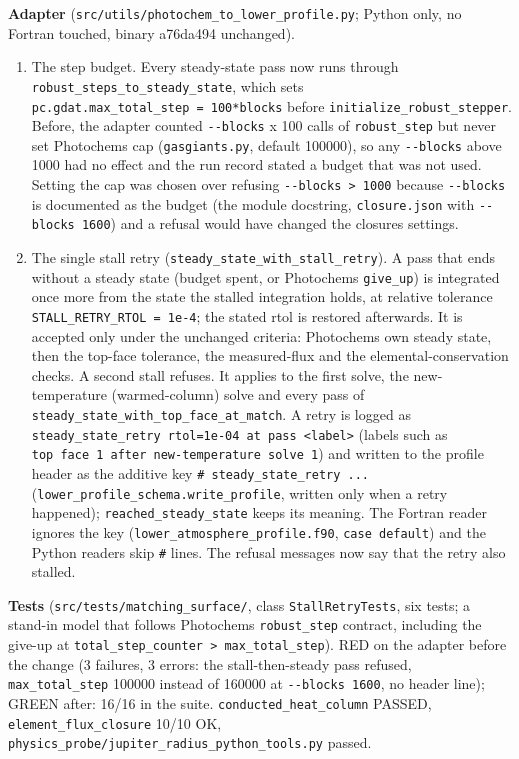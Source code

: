 \documentclass[english,a4paper]{my_memo}
\providecommand{\tightlist}{\setlength{\itemsep}{0pt}\setlength{\parskip}{0pt}}
\begin{document}
\textbf{Adapter} (\texttt{src/utils/photochem\_to\_lower\_profile.py}; Python only, no Fortran
touched, binary a76da494 unchanged).

\begin{enumerate}
\def\labelenumi{\arabic{enumi}.}
\tightlist
\item
  The step budget. Every steady-state pass now runs through
  \texttt{robust\_steps\_to\_steady\_state}, which sets \texttt{pc.gdat.max\_total\_step\ =\ 100*blocks}
  before \texttt{initialize\_robust\_stepper}. Before, the adapter counted \texttt{-\/-blocks} x 100
  calls of \texttt{robust\_step} but never set Photochem\textquotesingle s cap (\texttt{gasgiants.py},
  default 100000), so any \texttt{-\/-blocks} above 1000 had no effect and the run record
  stated a budget that was not used. Setting the cap was chosen over refusing
  \texttt{-\/-blocks\ \textgreater{}\ 1000} because \texttt{-\/-blocks} is documented as the budget (the module
  docstring, \texttt{closure.json} with \texttt{-\/-blocks\ 1600}) and a refusal would have changed
  the closure\textquotesingle s settings.
\item
  The single stall retry (\texttt{steady\_state\_with\_stall\_retry}). A pass that ends
  without a steady state (budget spent, or Photochem\textquotesingle s \texttt{give\_up}) is integrated
  once more from the state the stalled integration holds, at relative tolerance
  \texttt{STALL\_RETRY\_RTOL\ =\ 1e-4}; the stated rtol is restored afterwards. It is accepted
  only under the unchanged criteria: Photochem\textquotesingle s own steady state, then the top-face
  tolerance, the measured-flux and the elemental-conservation checks. A second stall
  refuses. It applies to the first solve, the new-temperature (warmed-column) solve
  and every pass of \texttt{steady\_state\_with\_top\_face\_at\_match}. A retry is logged as
  \texttt{steady\_state\_retry\ rtol=1e-04\ at\ pass\ \textless{}label\textgreater{}} (labels such as \texttt{top\ face\ 1\ after\ new-temperature\ solve\ 1}) and written to the profile header as the additive key
  \texttt{\#\ steady\_state\_retry\ ...} (\texttt{lower\_profile\_schema.write\_profile}, written only
  when a retry happened); \texttt{reached\_steady\_state} keeps its meaning. The Fortran
  reader ignores the key (\texttt{lower\_atmosphere\_profile.f90}, \texttt{case\ default}) and the
  Python readers skip \texttt{\#} lines. The refusal messages now say that the retry also
  stalled.
\end{enumerate}

\textbf{Tests} (\texttt{src/tests/matching\_surface/}, class \texttt{StallRetryTests}, six tests; a
stand-in model that follows Photochem\textquotesingle s \texttt{robust\_step} contract, including the give-up
at \texttt{total\_step\_counter\ \textgreater{}\ max\_total\_step}). RED on the adapter before the change
(3 failures, 3 errors: the stall-then-steady pass refused, \texttt{max\_total\_step} 100000
instead of 160000 at \texttt{-\/-blocks\ 1600}, no header line); GREEN after: 16/16 in the
suite. \texttt{conducted\_heat\_column} PASSED, \texttt{element\_flux\_closure} 10/10 OK,
\texttt{physics\_probe/jupiter\_radius\_python\_tools.py} passed.
\end{document}
